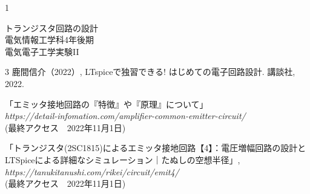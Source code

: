 \documentclass[12pt,a4j,dvipdfmx]{jarticle}
\begin{document}
\thispagestyle{empty}
\begin{spacing}{1}
\begin{center}
\vspace*{3.5cm}
{\Huge トランジスタ回路の設計}\\
\vspace*{12.5cm}
{\Large 電気情報工学科4年後期}\\
{\Large 電気電子工学実験II}\\
\vspace*{1cm}

\end{center}

\newpage
{}
\tableofcontents
\end{spacing}
\clearpage
{}
\pagestyle{fancy}
\setlength{\headheight}{5truemm}









\pagestyle{plain}

\begin{thebibliography}{3}
鹿間信介（2022）, 
LTspiceで独習できる! はじめての電子回路設計. 
講談社, 2022.

「エミッタ接地回路の『特徴』や『原理』について」\\{\it https://detail-infomation.com/amplifier-common-emitter-circuit/}\\
(最終アクセス　2022年11月1日)


「トランジスタ(2SC1815)によるエミッタ接地回路【4】：電圧増幅回路の設計とLTSpiceによる詳細なシミュレーション｜たぬしの空想半径」, {\it https://tanukitanushi.com/rikei/circuit/emit4/}\\
(最終アクセス　2022年11月1日)
\end{thebibliography}
\end{document}

